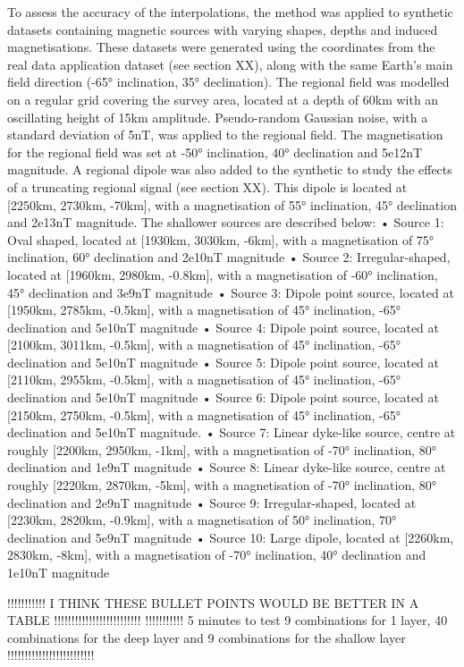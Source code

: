 To assess the accuracy of the interpolations, the method was applied to synthetic datasets containing magnetic sources with varying shapes, depths and induced magnetisations. These datasets were generated using the coordinates from the real data application dataset (see section XX), along with the same Earth’s main field direction (-65° inclination, 35° declination). The regional field was modelled on a regular grid covering the survey area, located at a depth of 60km with an oscillating height of 15km amplitude. Pseudo-random Gaussian noise, with a standard deviation of 5nT, was applied to the regional field. The magnetisation for the regional field was set at -50° inclination, 40° declination and 5e12nT magnitude. A regional dipole was also added to the synthetic to study the effects of a truncating regional signal (see section XX). This dipole is located at [2250km, 2730km, -70km], with a magnetisation of 55° inclination, 45° declination and 2e13nT magnitude. The shallower sources are described below:
•	Source 1: Oval shaped, located at [1930km, 3030km, -6km], with a magnetisation of 75° inclination, 60° declination and 2e10nT magnitude
•	Source 2: Irregular-shaped, located at [1960km, 2980km, -0.8km], with a magnetisation of -60° inclination, 45° declination and 3e9nT magnitude
•	Source 3: Dipole point source, located at [1950km, 2785km, -0.5km], with a magnetisation of 45° inclination, -65° declination and 5e10nT magnitude
•	Source 4: Dipole point source, located at [2100km, 3011km, -0.5km], with a magnetisation of 45° inclination, -65° declination and 5e10nT magnitude
•	Source 5: Dipole point source, located at [2110km, 2955km, -0.5km], with a magnetisation of 45° inclination, -65° declination and 5e10nT magnitude
•	Source 6: Dipole point source, located at [2150km, 2750km, -0.5km], with a magnetisation of 45° inclination, -65° declination and 5e10nT magnitude.
•	Source 7: Linear dyke-like source, centre at roughly [2200km, 2950km, -1km], with a magnetisation of -70° inclination, 80° declination and 1e9nT magnitude
•	Source 8: Linear dyke-like source, centre at roughly [2220km, 2870km, -5km], with a magnetisation of -70° inclination, 80° declination and 2e9nT magnitude
•	Source 9: Irregular-shaped, located at [2230km, 2820km, -0.9km], with a magnetisation of 50° inclination, 70° declination and 5e9nT magnitude
•	Source 10: Large dipole, located at [2260km, 2830km, -8km], with a magnetisation of -70° inclination, 40° declination and 1e10nT magnitude

!!!!!!!!!!! I THINK THESE BULLET POINTS WOULD BE BETTER IN A TABLE !!!!!!!!!!!!!!!!!!!!!!!!!
!!!!!!!!!!! 5 minutes to test 9 combinations for 1 layer, 40 combinations for the deep layer and 9 combinations for the shallow layer !!!!!!!!!!!!!!!!!!!!!!!!!


